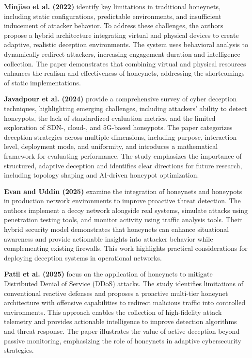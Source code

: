 \documentclass[12pt]{article}
\begin{document}
\textbf{Minjiao et al. (2022)} identify key limitations in traditional honeynets, including static configurations, predictable environments, and insufficient inducement of attacker behavior. To address these challenges, the authors propose a hybrid architecture integrating virtual and physical devices to create adaptive, realistic deception environments. The system uses behavioral analysis to dynamically redirect attackers, increasing engagement duration and intelligence collection. The paper demonstrates that combining virtual and physical resources enhances the realism and effectiveness of honeynets, addressing the shortcomings of static implementations. 

\textbf{Javadpour et al. (2024)} provide a comprehensive survey of cyber deception techniques, highlighting emerging challenges, including attackers’ ability to detect honeypots, the lack of standardized evaluation metrics, and the limited exploration of SDN-, cloud-, and 5G-based honeypots. The paper categorizes deception strategies across multiple dimensions, including purpose, interaction level, deployment mode, and uniformity, and introduces a mathematical framework for evaluating performance. The study emphasizes the importance of structured, adaptive deception and identifies clear directions for future research, including topology shaping and AI-driven honeypot optimization. 

\textbf{Evan and Uddin (2025)} examine the integration of honeynets and honeypots in production network environments to improve proactive threat detection. The authors implement a decoy network alongside real systems, simulate attacks using penetration testing tools, and monitor activity using traffic analysis tools. Their hybrid security model demonstrates that honeynets can enhance situational awareness and provide actionable insights into attacker behavior while complementing existing firewalls. This work highlights practical considerations for deploying deception systems in operational networks. 

\textbf{Patil et al. (2025)} focus on the application of honeynets to mitigate Distributed Denial of Service (DDoS) attacks. The study identifies limitations of conventional reactive defenses and proposes a proactive multi-tier honeynet architecture with offensive capabilities to redirect malicious traffic into controlled environments. This approach enables the collection of high-fidelity attack telemetry and provides actionable intelligence to improve detection algorithms and threat response. The paper illustrates the value of active deception beyond passive monitoring, emphasizing the role of honeynets in adaptive cybersecurity strategies. 
\end{document}
